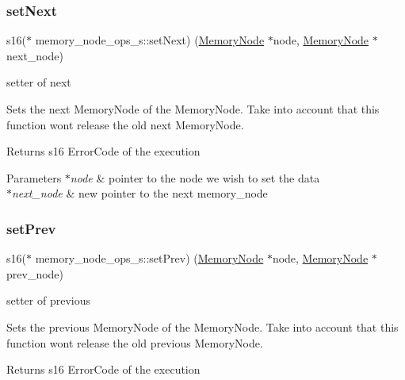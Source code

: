 \subsubsection{\texorpdfstring{set\+Next}{setNext}}
{\footnotesize\ttfamily s16($\ast$ memory\+\_\+node\+\_\+ops\+\_\+s\+::set\+Next) (\hyperlink{structmemory__node__s}{Memory\+Node} $\ast$node, \hyperlink{structmemory__node__s}{Memory\+Node} $\ast$next\+\_\+node)}



setter of next 

Sets the next Memory\+Node of the Memory\+Node. Take into account that this function won\textquotesingle{}t release the old next Memory\+Node.

\begin{DoxyReturn}{Returns}
s16 Error\+Code of the execution 
\end{DoxyReturn}

\begin{DoxyParams}{Parameters}
{\em $\ast$node} & pointer to the node we wish to set the data \\
\hline
{\em $\ast$next\+\_\+node} & new pointer to the next memory\+\_\+node \\
\hline
\end{DoxyParams}
\mbox{\label{structmemory__node__ops__s_a352f9fd77b1f1ccff52c0e285b06bd85}} 
\subsubsection{\texorpdfstring{set\+Prev}{setPrev}}
{\footnotesize\ttfamily s16($\ast$ memory\+\_\+node\+\_\+ops\+\_\+s\+::set\+Prev) (\hyperlink{structmemory__node__s}{Memory\+Node} $\ast$node, \hyperlink{structmemory__node__s}{Memory\+Node} $\ast$prev\+\_\+node)}



setter of previous 

Sets the previous Memory\+Node of the Memory\+Node. Take into account that this function won\textquotesingle{}t release the old previous Memory\+Node.

\begin{DoxyReturn}{Returns}
s16 Error\+Code of the execution 
\end{DoxyReturn}

